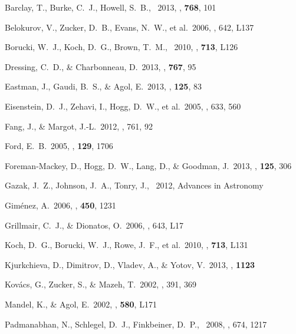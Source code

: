 \documentclass[letterpaper,12pt,preprint]{hack_aastex}
\begin{document}
\clearpage
\begin{thebibliography}{}\raggedright%

Barclay, T., Burke, C.~J., Howell, S.~B., \etal\ 2013, \apj, \textbf{768}, 101

Belokurov, V., Zucker, D.~B., Evans, N.~W., et al.\ 2006, \apjl, 642, L137

Borucki, W.~J., Koch, D.~G., Brown, T.~M., \etal\ 2010, \apjl,
\textbf{713}, L126

Dressing, C.~D., \& Charbonneau, D.\ 2013, \apj, \textbf{767}, 95

Eastman, J., Gaudi, B.~S., \& Agol, E.\ 2013, \pasp, \textbf{125}, 83

Eisenstein, D.~J., Zehavi, I., Hogg, D.~W., et al.\ 2005, \apj, 633, 560

Fang, J., \& Margot, J.-L.\ 2012, \apj, 761, 92

Ford, E.~B.\ 2005, \aj, \textbf{129}, 1706

Foreman-Mackey, D., Hogg, D.~W., Lang, D., \& Goodman, J.\ 2013,
\pasp, \textbf{125}, 306

Gazak, J.~Z., Johnson, J.~A., Tonry, J., \etal\ 2012, Advances in Astronomy

Gim{\'e}nez, A.\ 2006, \aap, \textbf{450}, 1231

Grillmair, C.~J., \& Dionatos, O.\ 2006, \apjl, 643, L17

Koch, D.~G., Borucki, W.~J., Rowe, J.~F., et al.\ 2010, \apjl,
\textbf{713}, L131

Kjurkchieva, D., Dimitrov, D., Vladev, A., \& Yotov, V.\ 2013, \mnras,
\textbf{1123}

Kov{\'a}cs, G., Zucker, S., \& Mazeh, T.\ 2002, \aap, 391, 369

Mandel, K., \& Agol, E.\ 2002, \apjl, \textbf{580}, L171

Padmanabhan, N., Schlegel, D.~J., Finkbeiner, D.~P., \etal\ 2008, \apj, 674, 1217


\end{thebibliography}
\end{document}

